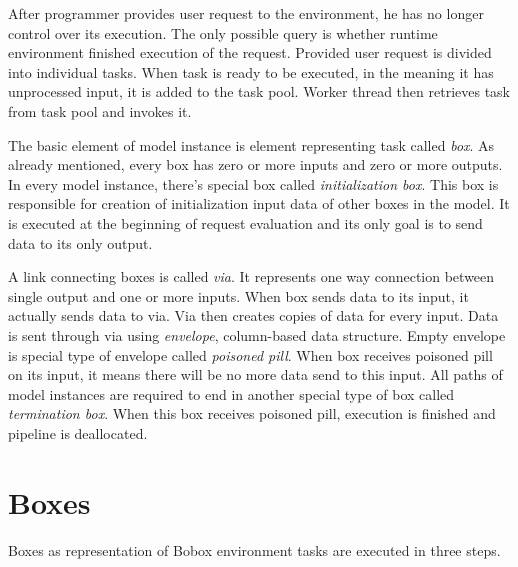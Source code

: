After programmer provides user request to the environment, he has no longer control over its execution. The only possible query is whether runtime environment finished execution of the request. Provided user request is divided into individual tasks. When task is ready to be executed, in the meaning it has unprocessed input, it is added to the task pool. Worker thread then retrieves task from task pool and invokes it.

The basic element of model instance is element representing task called \emph{box}.  As already mentioned, every box has zero or more inputs and zero or more outputs. In every model instance, there's special box called \emph{initialization box}. This box is responsible for creation of initialization input data of other boxes in the model. It is executed at the beginning of request evaluation and its only goal is to send data to its only output.

A link connecting boxes is called \emph{via}. It represents one way connection between single output and one or more inputs. When box sends data to its input, it actually sends data to via. Via then creates copies of data for every input. Data is sent through via using \emph{envelope}, column-based data structure. Empty envelope is special type of envelope called \emph{poisoned pill}. When box receives poisoned pill on its input, it means there will be no more data send to this input. All paths of model instances are required to end in another special type of box called \emph{termination box}. When this box receives poisoned pill, execution is finished and pipeline is deallocated.

\section{Boxes}
Boxes as representation of Bobox environment tasks are executed in three steps.

